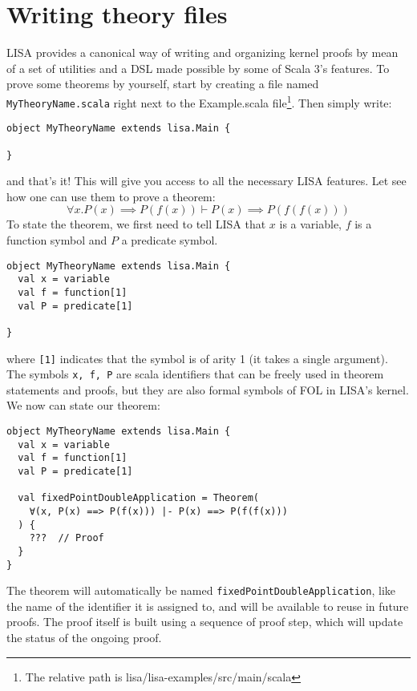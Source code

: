 \section{Writing theory files}
LISA provides a canonical way of writing and organizing kernel proofs by mean of a set of utilities and a DSL made possible by some of Scala 3's features.
To prove some theorems by yourself, start by creating a file named \lstinline|MyTheoryName.scala| right next to the Example.scala file\footnote{The relative path is lisa/lisa-examples/src/main/scala}.
Then simply write:

\noindent\begin{minipage}{\linewidth}\vspace{1em}
\begin{lstlisting}[language=lisa, frame=single]
object MyTheoryName extends lisa.Main {

}
\end{lstlisting}
\end{minipage}
and that's it! This will give you access to all the necessary LISA features. Let see how one can use them to prove a theorem:
$$
  \forall x. P(x) \implies P(f(x)) \vdash P(x) \implies P(f(f(x)))
$$
To state the theorem, we first need to tell LISA that $x$ is a variable, $f$ is a function symbol and $P$ a predicate symbol. 

\noindent\begin{minipage}{\linewidth}\vspace{1em}
\begin{lstlisting}[language=lisa, frame=single]
object MyTheoryName extends lisa.Main {
  val x = variable
  val f = function[1]
  val P = predicate[1]

}
\end{lstlisting}
\end{minipage}

where \lstinline|[1]| indicates that the symbol is of arity 1 (it takes a single argument). The symbols \lstinline|x, f, P| are scala identifiers that can be freely used in theorem statements and proofs, but they are also formal symbols of FOL in LISA's kernel. 
We now can state our theorem:

\noindent\begin{minipage}{\linewidth}\vspace{1em}
\begin{lstlisting}[language=lisa, frame=single]
object MyTheoryName extends lisa.Main {
  val x = variable
  val f = function[1]
  val P = predicate[1]

  val fixedPointDoubleApplication = Theorem(
    ∀(x, P(x) ==> P(f(x))) |- P(x) ==> P(f(f(x)))
  ) {
    ???  // Proof
  } 
}
\end{lstlisting}
\end{minipage}
The theorem will automatically be named \lstinline|fixedPointDoubleApplication|, like the name of the identifier it is assigned to, and will be available to reuse in future proofs. The proof itself is built using a sequence of proof step, which will update the status of the ongoing proof.

